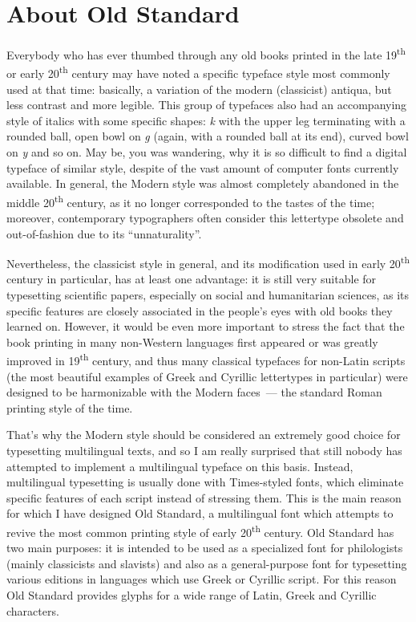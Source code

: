 \documentclass[12pt,a4paper,openany]{book}
\begin{document}
\chapter{About Old Standard}
\thispagestyle{empty}

Everybody who has ever thumbed through any old books printed in the late
19\textsuperscript{th} or early 20\textsuperscript{th} century may have
noted a specific typeface style most commonly used at that time: basically,
a variation of the modern (classicist) antiqua, but less contrast and more
legible. This group of typefaces also had an accompanying style of italics
with some specific shapes: \textit{k} with the upper leg terminating with a
rounded ball, open bowl on \textit{g} (again, with a rounded ball at its end),
curved bowl on \textit{y} and so on. May be, you was wandering, why it is so
difficult to find a digital typeface of similar style, despite of the vast
amount of computer fonts currently available. In general, the Modern style
was almost completely abandoned in the middle 20\textsuperscript{th}
century, as it no longer corresponded to the tastes of the time; moreover,
contemporary typographers often consider this lettertype obsolete and
out-of-fashion due to its “unnaturality”.

Nevertheless, the classicist style in general, and its modification used in
early 20\textsuperscript{th} century in particular, has at least one
advantage: it is still very suitable for typesetting scientific papers,
especially on social and humanitarian sciences, as its specific features
are closely associated in the people’s eyes with old books they learned on.
However, it would be even more important to stress the fact that the book
printing in many non-Western languages first appeared or was greatly
improved in 19\textsuperscript{th} century, and thus many classical
typefaces for non-Latin scripts (the most beautiful examples of Greek and
Cyrillic lettertypes in particular) were designed to be harmonizable with
the Modern faces~— the standard Roman printing style of the time.

That’s why the Modern style should be considered an extremely good choice
for typesetting multilingual texts, and so I am really surprised that still
nobody has attempted to implement a multilingual typeface on this basis.
Instead, multilingual typesetting is usually done with Times-styled fonts,
which eliminate specific features of each script instead of stressing them.
This is the main reason for which I have designed Old Standard, a
multilingual font which attempts to revive the most common printing style
of early 20\textsuperscript{th} century. Old Standard has two main
purposes: it is intended to be used as a specialized font for philologists
(mainly classicists and slavists) and also as a general-purpose font for
typesetting various editions in languages which use Greek or Cyrillic
script. For this reason Old Standard provides glyphs for a wide range of
Latin, Greek and Cyrillic characters.
\end{document}
